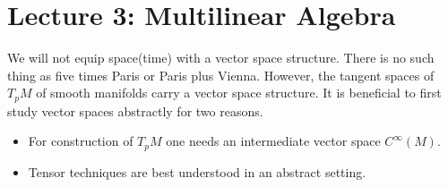 \documentclass[10pt, oneside]{article}
\begin{document}
\section{Lecture 3: Multilinear Algebra \cite{MultiA}}
        We will not equip space(time) with a vector space structure. There is no such thing as five times Paris or Paris plus Vienna. However, the tangent spaces of $T_p M$ of smooth manifolds carry a vector space structure.
        It is beneficial to first study vector spaces abstractly for two reasons.
        \begin{itemize}
           \item For construction of $T_p M$ one needs an intermediate vector space $C^\infty (M)$.
           \item Tensor techniques are best understood in an abstract setting.
        \end{itemize}
\end{document}

